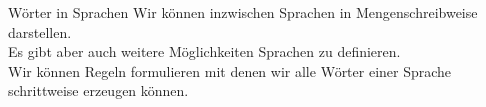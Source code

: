 %
%
%
%

\begin{frame}[fragile]{Wörter in Sprachen}
Wir können inzwischen Sprachen in Mengenschreibweise darstellen.\\Es gibt aber auch weitere Möglichkeiten Sprachen zu definieren.\\
\vspace{0.3cm}
Wir können Regeln formulieren mit denen wir alle Wörter einer Sprache schrittweise erzeugen können.
\end{frame}

